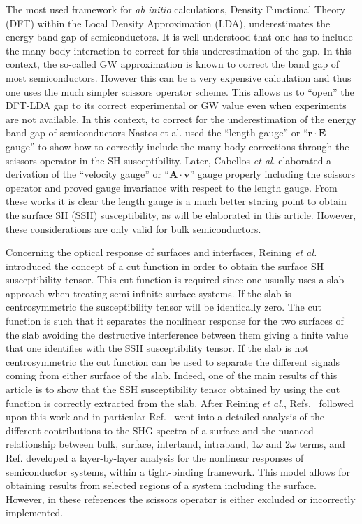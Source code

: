 \documentclass[floatfix,prb,aps,superscriptaddress,showpacs,11pt,preprint,letterpaper]{revtex4}
\begin{document}
The most used framework for \textit{ab initio} calculations, Density 
Functional Theory (DFT) within the Local Density Approximation (LDA),
\cite{kohnPR65} underestimates the energy band gap of semiconductors. It is 
well understood that one has to include the many-body interaction to correct 
for this underestimation of the gap. In this context, the so-called GW 
approximation\cite{onidaRMP02} is known to correct the band gap of most 
semiconductors\cite{luceroJPCM12}. However this can be a very expensive
calculation and thus one uses the much simpler scissors operator scheme.
\cite{levinePRL89,levinePRL91,delsolePRB93}  
This allows us to ``open'' the DFT-LDA gap to 
its correct experimental or GW value even when experiments are not available. 
In this context, to correct for the underestimation of the energy band gap of 
semiconductors Nastos et al.\cite{nastosPRB05} used the ``length gauge'' or 
``$\mathbf{r}\cdot\mathbf{E}$ gauge'' to show how to correctly include the 
many-body corrections through the scissors operator in the SH susceptibility.
Later, Cabellos \textit{et al}.\cite{cabellosPRB09} elaborated a derivation 
of the ``velocity gauge'' or ``$\mathbf{A}\cdot\mathbf{v}$'' gauge properly including the 
scissors operator and proved gauge invariance with respect to the length 
gauge. From these works it is clear the length gauge is a much better staring
point to obtain the surface SH (SSH) susceptibility, as will be elaborated 
in this article. However, these considerations are only valid for bulk 
semiconductors.

Concerning the optical response of surfaces and interfaces, Reining 
\textit{et al.}\cite{reiningPRB94} introduced the concept of a cut function 
in order to obtain the surface SH susceptibility tensor. This cut function 
is required since one usually uses a slab approach when treating semi-infinite 
surface systems. If the slab is centrosymmetric the susceptibility tensor will 
be identically zero. The cut function is such that it separates the nonlinear 
response for the two surfaces of the slab avoiding the destructive 
interference between them giving a finite value that one identifies with the 
SSH susceptibility tensor. If the slab is not centrosymmetric the cut function 
can be used to separate the different signals coming from either surface of 
the slab. Indeed, one of the main results of this article is to show that the 
SSH  susceptibility tensor obtained by using the cut function is correctly 
extracted from the slab. After Reining \textit{et al.},\cite{reiningPRB94}
Refs.~
followed 
upon this work and in particular Ref.~ went into a 
detailed analysis of the different contributions to the SHG spectra of a 
surface and the nuanced relationship between bulk, surface, interband, 
intraband, $1\omega$ and $2\omega$ terms, and
Ref.  developed a layer-by-layer 
analysis for the nonlinear responses of semiconductor systems, within a 
tight-binding framework. This model allows for obtaining results from 
selected regions of a system including the surface. However, in these 
references the scissors operator is either excluded or incorrectly 
implemented.
\end{document}
